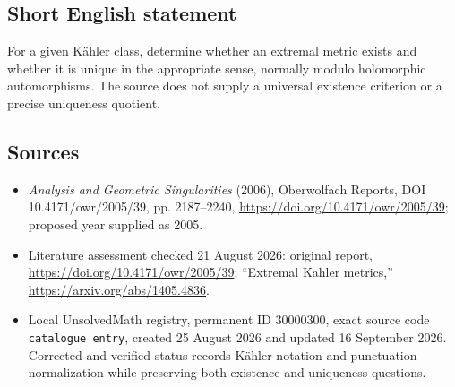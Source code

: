 \documentclass[11pt]{article}
\begin{document}
\subsection{Short English statement}
For a given K\"ahler class, determine whether an extremal metric exists and whether it is unique in the appropriate sense, normally modulo holomorphic automorphisms. The source does not supply a universal existence criterion or a precise uniqueness quotient.
\subsection{Sources}
\begin{itemize}
\item \emph{Analysis and Geometric Singularities} (2006), Oberwolfach Reports, DOI 10.4171/owr/2005/39, pp. 2187--2240, \url{https://doi.org/10.4171/owr/2005/39}; proposed year supplied as 2005.
\item Literature assessment checked 21 August 2026: original report, \url{https://doi.org/10.4171/owr/2005/39}; ``Extremal Kahler metrics,'' \url{https://arxiv.org/abs/1405.4836}.
\item Local UnsolvedMath registry, permanent ID $30000300$, exact source code \texttt{catalogue entry}, created 25 August 2026 and updated 16 September 2026. Corrected-and-verified status records K\"ahler notation and punctuation normalization while preserving both existence and uniqueness questions.
\end{itemize}
\end{document}
